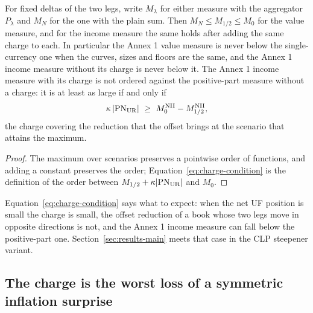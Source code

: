\begin{corollary}
\label{cor:measures}
For fixed deltas of the two legs, write $M_{\lambda}$ for either measure with the aggregator $P_\lambda$ and $M_N$ for the one with the plain sum. Then $M_N\le M_{1/2}\le M_{0}$ for the value measure, and for the income measure the same holds after adding the same charge to each. In particular the Annex 1 value measure is never below the single-currency one when the curves, sizes and floors are the same, and the Annex 1 income measure without its charge is never below it. The Annex 1 income measure with its charge is not ordered against the positive-part measure without a charge: it is at least as large if and only if
\begin{equation}
\kappa\,|\PNUR|\ \ge\ M_{0}^{\mathrm{NII}}-M_{1/2}^{\mathrm{NII}},
\label{eq:charge-condition}
\end{equation}
the charge covering the reduction that the offset brings at the scenario that attains the maximum.
\end{corollary}
\begin{proof}
The maximum over scenarios preserves a pointwise order of functions, and adding a constant preserves the order; Equation~\eqref{eq:charge-condition} is the definition of the order between $M_{1/2}+\kappa|\mathrm{PN}_{\mathrm{UR}}|$ and $M_0$.
\end{proof}

Equation~\eqref{eq:charge-condition} says what to expect: when the net UF position is small the charge is small, the offset reduction of a book whose two legs move in opposite directions is not, and the Annex 1 income measure can fall below the positive-part one. Section~\ref{sec:results-main} meets that case in the CLP steepener variant.

\subsection{The charge is the worst loss of a symmetric inflation surprise}
\label{sec:theory-charge}

